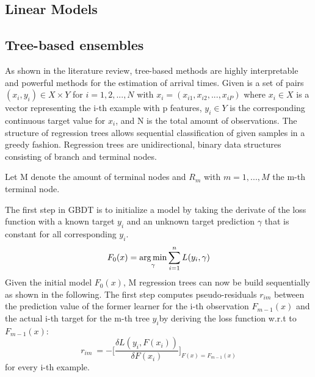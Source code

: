 \subsection{Linear Models}

\subsection{Tree-based ensembles}

As shown in the literature review, tree-based methods are highly interpretable and powerful methods for the estimation of arrival times. Given is a set of pairs $ (x_i, y_i) \in X \times Y$ for $ i = 1,2, ..., N $ with $ x_i = (x_{i1}, x_{i2}, ..., x_{iP}) $ where $ x_i \in X$ is a vector representing the i-th example with p features, $ y_i \in Y$ is the corresponding continuous target value for $ x_i $, and N is the total amount of observations. The structure of regression trees allows sequential classification of given samples in a greedy fashion. Regression trees are unidirectional, binary data structures consisting of branch and terminal nodes.

Let M denote the amount of terminal nodes and $ R_m $ with $ m = 1, ..., M $ the m-th terminal node. 









 











The first step in GBDT is to initialize a model by taking the derivate of the loss function with a known target $ y_i $ and an unknown target prediction $ \gamma $ that is constant for all corresponding $ y_i $.
\begin{equation}
F_{0}(x) =  \operatorname*{arg\,min}_{\gamma} \sum_{i=1}^n L(y_i,\gamma) \label{gbdt_step1}
\end{equation}
Given the initial model $ F_0(x) $, M regression trees can now be build sequentially as shown in the following. 
The first step computes pseudo-residuals $ r_{im} $ between the prediction value of the former learner for the i-th observation $ F_{m-1}(x) $ and the actual i-th target for the m-th tree $ y_i $by deriving the loss function w.r.t to $ F_{m-1}(x) $: 
\begin{equation}
	r_{im}\ = - \bigg[\dfrac{\delta L(y_i, F(x_i))}{\delta F(x_i)}\bigg]_{F(x) = F_{m-1}(x)}
\end{equation} 
for every i-th example.


